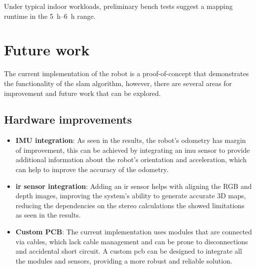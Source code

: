 Under typical indoor workloads, preliminary bench tests suggest a mapping runtime in the \SIrange{5}{6}{\hour} range.




\chapter{Future work}\label{ch:future_work}

The current implementation of the robot is a proof-of-concept that demonstrates the functionality of the \gls{slam} algorithm, however, there are several areas for improvement and future work that can be explored.

\section{Hardware improvements}

\begin{itemize}
  \item \textbf{IMU integration}: As seen in the results, the robot's odometry has margin of improvement, this can be achieved by integrating an \gls{imu} sensor to provide additional information about the robot's orientation and acceleration, which can help to improve the accuracy of the odometry.
  \item \textbf{\gls{ir} sensor integration}: Adding an \gls{ir} sensor helps with aligning the RGB and depth images, improving the system's ability to generate accurate 3D maps, reducing the dependencies on the stereo calculations the showed limitations as seen in the results.
  \item \textbf{Custom PCB}: The current implementation uses modules that are connected via cables, which lack cable management and can be prone to disconnections and accidental short circuit. A custom \gls{pcb} can be designed to integrate all the modules and sensors, providing a more robust and reliable solution.
\end{itemize}
